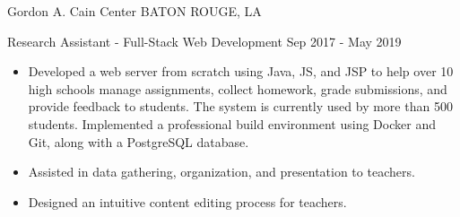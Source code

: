 \documentclass[10pt,a4paper]{article}
\begin{document}
  \headedsection
{Gordon A. Cain Center}
{\textsc{BATON ROUGE, LA}}
{
  \headedsubsection
  {Research Assistant - Full-Stack Web Development}
  {Sep 2017 - May 2019}
  {
    \begin{itemize}
      \item Developed a web server from scratch using Java, JS, and JSP to help over 10 high schools manage assignments, collect homework, grade submissions, and provide feedback to students. The system is currently used by more than 500 students. Implemented a professional build environment using Docker and Git, along with a PostgreSQL database.
      \item Assisted in data gathering, organization, and presentation to teachers.
      \item Designed an intuitive content editing process for teachers.
    \end{itemize}
  }
}
\end{document}
